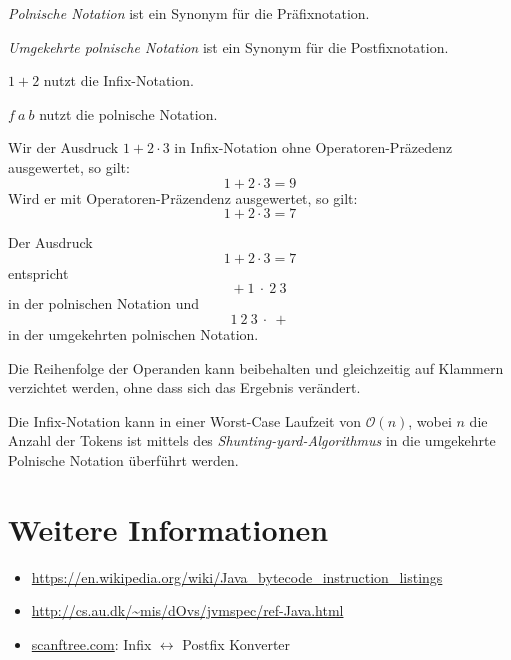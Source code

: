 \textit{Polnische Notation} ist ein Synonym für die Präfixnotation.

\textit{Umgekehrte polnische Notation} ist ein Synonym für die Postfixnotation.

\begin{beispiel}
    \begin{bspenum}
        \item $1 + 2$ nutzt die Infix-Notation.
        \item $f\ a\ b$ nutzt die polnische Notation.
        \item Wir der Ausdruck $1 + 2 \cdot 3$ in Infix-Notation ohne Operatoren-Präzedenz
              ausgewertet, so gilt:
              \[1 + 2 \cdot 3 = 9\]
              Wird er mit Operatoren-Präzendenz ausgewertet, so gilt:
              \[1 + 2 \cdot 3 = 7\]
        \item Der Ausdruck
              \[1 + 2 \cdot 3 = 7\]
              entspricht
              \[+\ 1\ \cdot\ 2\ 3\]
              in der polnischen Notation und
              \[1\ 2\ 3\ \cdot\ +\]
              in der umgekehrten polnischen Notation.
    \end{bspenum}
\end{beispiel}

\begin{bemerkung}
    \begin{bemenum}
        \item Die Reihenfolge der Operanden kann beibehalten und gleichzeitig
              auf Klammern verzichtet werden, ohne dass sich das Ergebnis
              verändert.
        \item Die Infix-Notation kann in einer Worst-Case Laufzeit von $\mathcal{O}(n)$,
              wobei $n$ die Anzahl der Tokens ist mittels des
              \textit{Shunting-yard-Algorithmus} in
              die umgekehrte Polnische Notation überführt werden.
    \end{bemenum}
\end{bemerkung}

\section{Weitere Informationen}
\begin{itemize}
    \item \url{https://en.wikipedia.org/wiki/Java_bytecode_instruction_listings}
    \item \url{http://cs.au.dk/~mis/dOvs/jvmspec/ref-Java.html}
    \item \href{http://scanftree.com/Data_Structure/prefix-postfix-infix-online-converter}{scanftree.com}:
          Infix $\leftrightarrow$ Postfix Konverter
\end{itemize}

